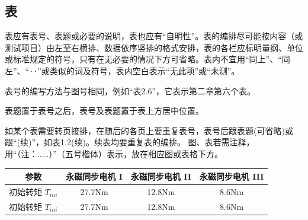 \subsection{表}

表应有表号、表题或必要的说明，表也应有“自明性”。表的编排尽可能按内容（或测试项目）由左至右横排、数据依序竖排的格式安排，表的各栏应标明量纲、单位或标准规定的符号，只有在无必要的情况下方可省略。表内不宜用“同上”、“同左”、“‥”或类似的词及符号，表内空白表示“无此项”或“未测”。

表号的编写方法与图号相同，例如“表2.6”，它表示第二章第六个表。

表题置于表号之后，表号及表题置于表上方居中位置。

如某个表需要转页接排，在随后的各页上要重复表号，表号后跟表题(可省略)或跟“(续)”，如表1.2(续)。续表均要重复表的编排。
图、表若需注释，用“（注：……）”（五号楷体）表示，放在相应图或表格下方。

\begin{table}[!ht]
	\centering
	 \label{rotationalframe}
\end{table}

\begin{table}[h]
	\centering
	\renewcommand{\arraystretch}{1.5} %
	\setlength{\tabcolsep}{15pt} %
	\begin{tabular}{cccc}
		\toprule[1.5pt]
		参数 & 永磁同步电机 I & 永磁同步电机 II & 永磁同步电机 III \\ \midrule[0.75pt]
		初始转矩 \(T_{ini}\) & 27.7Nm & 12.8Nm & 8.6Nm\\
		初始转矩 \(T_{ini}\) & 27.7Nm & 12.8Nm & 8.6Nm \\ \bottomrule[1.5pt]  
	\end{tabular}
\end{table}



